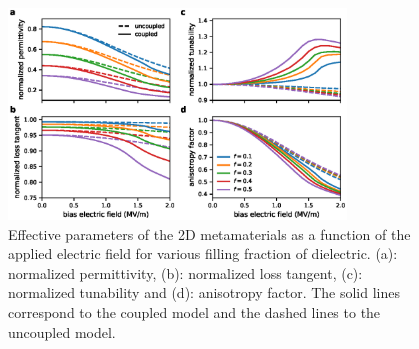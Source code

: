 \documentclass[%
 reprint,
 amsmath,amssymb,
 aps,
]{revtex4-2}
\begin{document}
\begin{figure}[!t]
\centering
\includegraphics[width=0.8\textwidth]{effpar_per}
\caption{Effective parameters of the 2D metamaterials as a function of the
 applied electric field for various filling fraction of dielectric.
 (a): normalized permittivity, (b): normalized loss tangent, (c): normalized tunability and
 (d): anisotropy factor. The solid lines correspond to the coupled model and
 the dashed lines to the uncoupled model.}
\label{eff_par_2D_TM}
\end{figure}


\end{document}
